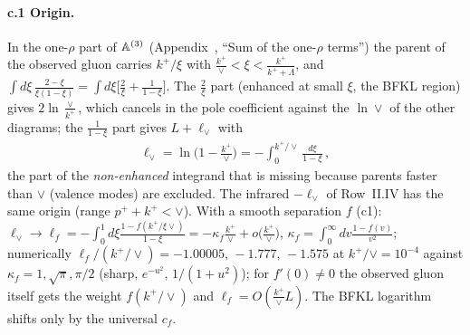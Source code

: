 \paragraph{c.1 Origin.} In the one-$\rho$ part of $\mathbb{A}^{(3)}$ (Appendix~, ``Sum of the one-$\rho$ terms'') the parent of the observed gluon carries $k^+/\xi$ with $\frac{k^+}{\vee}<\xi<\frac{k^+}{k^++\Lambda}$, and $\int d\xi\,\frac{2-\xi}{\xi(1-\xi)}=\int d\xi\big[\frac2\xi+\frac1{1-\xi}\big]$. The $\frac2\xi$ part (enhanced at small $\xi$, the BFKL region) gives $2\ln\frac\vee{k^+}$, which cancels in the pole coefficient against the $\ln\vee$ of the other diagrams; the $\frac{1}{1-\xi}$ part gives $L+\ell_\vee$ with
\begin{align}
\ell_\vee=\ln\Big(1-\frac{k^+}{\vee}\Big)=-\int_0^{k^+/\vee}\frac{d\xi}{1-\xi}\,,
\end{align}
the part of the \emph{non-enhanced} integrand that is missing because parents faster than $\vee$ (valence modes) are excluded. The infrared $-\ell_\vee$ of Row~II.IV has the same origin (range $p^++k^+<\vee$). With a smooth separation $f$ (c1): $\ell_\vee\to\ell_f=-\int_0^1d\xi\frac{1-f(k^+/\xi\vee)}{1-\xi}=-\kappa_f\frac{k^+}{\vee}+o\big(\frac{k^+}{\vee}\big)$, $\kappa_f=\int_0^\infty dv\frac{1-f(v)}{v^2}$; numerically $\ell_f/(k^+/\vee)=-1.00005,\,-1.777,\,-1.575$ at $k^+/\vee=10^{-4}$ against $\kappa_f=1,\sqrt\pi,\pi/2$ (sharp, $e^{-u^2}$, $1/(1+u^2)$); for $f'(0)\neq0$ the observed gluon itself gets the weight $f(k^+/\vee)$ and $\ell_f=O(\frac{k^+}{\vee}L)$. The BFKL logarithm shifts only by the universal $c_f$.

